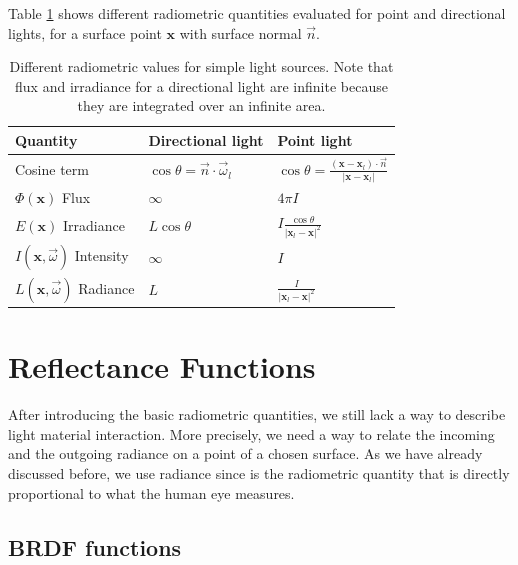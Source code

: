 Table \ref{table:radio} shows different radiometric quantities evaluated for point and directional lights, for a surface point $\mathbf{x}$ with surface normal $\vec{n}$. 

\renewcommand{\arraystretch}{1.8}
\begin{table}[!ht]
    \centering
    \begin{tabularx}{0.95\textwidth}{|X|X|X|}
    \hline
    Quantity   & Directional light & Point light \\ \hline
    Cosine term       & $\cos\theta = \vec{n} \cdot \vec{\omega}_l$ & $\cos\theta = \frac{(\mathbf{x} - \mathbf{x}_l) \cdot \vec{n}}{|\mathbf{x} - \mathbf{x}_l|}$     \\ \hline

    $\Phi(\mathbf{x})$ Flux       & $\infty$                  & $4 \pi I$           \\ \hline
    $E(\mathbf{x})$ Irradiance & $L \cos\theta $                 & $I \frac{\cos\theta}{|\mathbf{x}_l - \mathbf{x}|^2}$          \\ \hline
    $I(\mathbf{x},\vec{\omega})$ Intensity  & $\infty$                 & $I$           \\ \hline
    $L(\mathbf{x},\vec{\omega})$ Radiance   & $L$               & $\frac{I}{|\mathbf{x}_l - \mathbf{x}|^2}$           \\ \hline
    \end{tabularx}
\caption{Different radiometric values for simple light sources. Note that flux and irradiance for a directional light are infinite because they are integrated over an infinite area.}
\label{table:radio}
\end{table}

\section{Reflectance Functions}
 
After introducing the basic radiometric quantities, we still lack a way to describe light material interaction. More precisely, we need a way to relate the incoming and the outgoing radiance on a point of a chosen surface. As we have already discussed before, we use radiance since is the radiometric quantity that is directly proportional to what the human eye measures. 

\subsection{BRDF functions}

